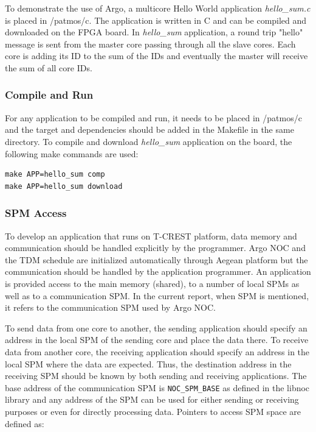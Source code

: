 \documentclass[a4paper,fontsize=10pt,twoside,DIV15,BCOR12mm,headinclude=true,footinclude=false,pagesize,bibtotoc]{scrbook}
\newcommand{\code}[1]{{\texttt{#1}}}
\begin{document}
To demonstrate the use of Argo, a multicore Hello World application \textit{hello\_sum.c} is placed in /patmos/c.
The application is written in C and can be compiled and downloaded on the FPGA board.
In \textit{hello\_sum} application, a round trip "hello" message is sent from the master core
passing through all the slave cores. Each core is adding its ID to the sum of the IDs and 
eventually the master will receive the sum of all core IDs.


\subsubsection{Compile and Run}
For any application to be compiled and run, it needs to be placed in /patmos/c and the target and dependencies 
should be added in the Makefile in the same directory.
To compile and download \textit{hello\_sum} application on the board, the following make commands are used:

\begin{verbatim}
make APP=hello_sum comp
make APP=hello_sum download
\end{verbatim}

\subsubsection{SPM Access}
To develop an application that runs on T-CREST platform, data memory and communication should be handled explicitly by the programmer. 
Argo NOC and the TDM schedule are initialized automatically through Aegean platform but the communication should be handled by the application programmer.
An application is provided access to the main memory (shared), to a number of local SPMs as well as to a communication SPM.
In the current report, when SPM is mentioned, it refers to the communication SPM used by Argo NOC.

To send data from one core to another, the sending application should specify an address in the local SPM of the sending core and place the data there.
To receive data from another core, the receiving application should specify an address in the local SPM where the data are expected. Thus, the 
destination address in the receiving SPM should be known by both sending and receiving applications.
The base address of the communication SPM is \code{NOC\_SPM\_BASE} as defined in the libnoc library 
and any address of the SPM can be used for either sending or receiving purposes or even for directly processing data.
Pointers to access SPM space are defined as:
\end{document}
